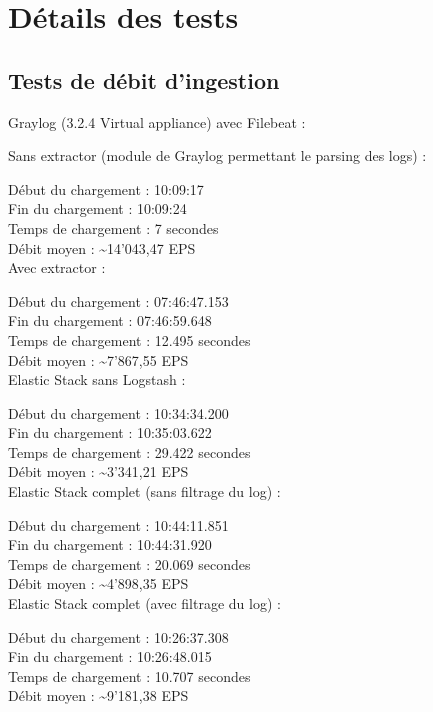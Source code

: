 \documentclass[paper=a4, fontsize=11pt]{scrartcl}
\begin{document}
\newpage



\section{Détails des tests}

\subsection{Tests de débit d'ingestion}

Graylog (3.2.4 Virtual appliance) avec Filebeat :

Sans extractor (module de Graylog permettant le parsing des logs) :

Début du chargement : 10:09:17 \\
Fin du chargement : 10:09:24 \\
Temps de chargement : 7 secondes \\
Débit moyen : \textasciitilde 14'043,47 EPS \\

Avec extractor :

Début du chargement : 07:46:47.153 \\
Fin du chargement : 07:46:59.648 \\
Temps de chargement : 12.495 secondes \\
Débit moyen : \textasciitilde 7'867,55 EPS \\

Elastic Stack sans Logstash :

Début du chargement : 10:34:34.200 \\
Fin du chargement : 10:35:03.622 \\
Temps de chargement : 29.422 secondes \\
Débit moyen : \textasciitilde 3'341,21 EPS \\

Elastic Stack complet (sans filtrage du log) :

Début du chargement : 10:44:11.851 \\
Fin du chargement : 10:44:31.920 \\
Temps de chargement : 20.069 secondes \\
Débit moyen : \textasciitilde 4'898,35 EPS \\

Elastic Stack complet (avec filtrage du log) :

Début du chargement : 10:26:37.308 \\
Fin du chargement : 10:26:48.015 \\
Temps de chargement : 10.707 secondes \\
Débit moyen : \textasciitilde 9'181,38 EPS \\
\end{document}
